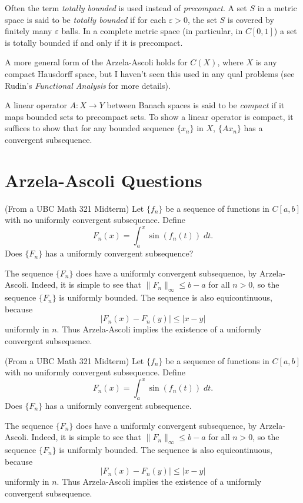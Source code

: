 \documentclass[answers]{exam}
\begin{document}
\begin{questions}
Often the term \emph{totally bounded} is used instead of \emph{precompact}. A set $S$ in a metric space is said to be \emph{totally bounded} if for each $\varepsilon > 0$, the set $S$ is covered by finitely many $\varepsilon$ balls. In a complete metric space (in particular, in $C[0,1]$) a set is totally bounded if and only if it is precompact.

A more general form of the Arzela-Ascoli holds for $C(X)$, where $X$ is any compact Hausdorff space, but I haven't seen this used in any qual problems (see Rudin's \textit{Functional Analysis} for more details).

A linear operator $A: X \to Y$ between Banach spaces is said to be \textit{compact} if it maps bounded sets to precompact sets. To show a linear operator is compact, it suffices to show that for any bounded sequence $\{ x_n \}$ in $X$, $\{ Ax_n \}$ has a convergent subsequence.


\newpage
\section{Arzela-Ascoli Questions}

\question (From a UBC Math 321 Midterm) Let $\{ f_n \}$ be a sequence of functions in $C[a,b]$ with no uniformly convergent subsequence. Define
%
\[ F_n(x) = \int_a^x \sin(f_n(t))\; dt. \]
%
Does $\{ F_n \}$ has a uniformly convergent subsequence?
\begin{solution}
    The sequence $\{ F_n \}$ does have a uniformly convergent subsequence, by Arzela-Ascoli. Indeed, it is simple to see that $\| F_n \|_\infty \leq b - a$ for all $n > 0$, so the sequence $\{ F_n \}$ is uniformly bounded. The sequence is also equicontinuous, because
    \[ |F_n(x) - F_n(y)| \leq |x - y| \]
    uniformly in $n$. Thus Arzela-Ascoli implies the existence of a uniformly convergent subsequence.
\end{solution}


\question (From a UBC Math 321 Midterm) Let $\{ f_n \}$ be a sequence of functions in $C[a,b]$ with no uniformly convergent subsequence. Define
%
\[ F_n(x) = \int_a^x \sin(f_n(t))\; dt. \]
%
Does $\{ F_n \}$ has a uniformly convergent subsequence.
\begin{solution}
    The sequence $\{ F_n \}$ does have a uniformly convergent subsequence, by Arzela-Ascoli. Indeed, it is simple to see that $\| F_n \|_\infty \leq b - a$ for all $n > 0$, so the sequence $\{ F_n \}$ is uniformly bounded. The sequence is also equicontinuous, because
    \[ |F_n(x) - F_n(y)| \leq |x - y| \]
    uniformly in $n$. Thus Arzela-Ascoli implies the existence of a uniformly convergent subsequence.
\end{solution}


\end{questions}
\end{document}

